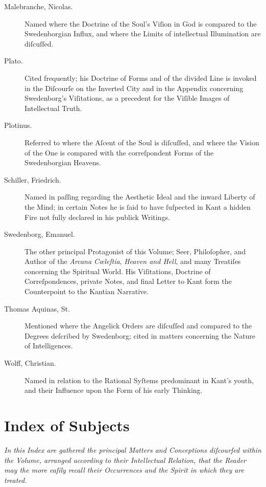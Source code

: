 \documentclass[12pt]{article}
\begin{document}
\begin{description}
\item[Malebranche, Nicolas.]  
Named where the Doctrine of the Soul’s Viſion in God is compared to the 
Swedenborgian Influx, and where the Limits of intellectual Illumination are 
diſcuſſed.

\item[Plato.]  
Cited frequently; his Doctrine of Forms and of the divided Line is invoked 
in the Diſcourſe on the Inverted City and in the Appendix concerning 
Swedenborg’s Viſitations, as a precedent for the Viſible Images of 
Intellectual Truth.

\item[Plotinus.]  
Referred to where the Aſcent of the Soul is diſcuſſed, and where the Vision 
of the One is compared with the correſpondent Forms of the Swedenborgian 
Heavens.

\item[Schiller, Friedrich.]  
Named in paſſing regarding the Aesthetic Ideal and the inward Liberty of the 
Mind; in certain Notes he is ſaid to have ſuſpected in Kant a hidden Fire not 
fully declared in his publick Writings.

\item[Swedenborg, Emanuel.]  
The other principal Protagonist of this Volume; Seer, Philoſopher, and 
Author of the \textit{Arcana Cœleſtia}, \textit{Heaven and Hell}, and many 
Treatiſes concerning the Spiritual World. His Viſitations, Doctrine of 
Correſpondences, private Notes, and final Letter to Kant form the 
Counterpoint to the Kantian Narrative.

\item[Thomas Aquinas, St.]  
Mentioned where the Angelick Orders are diſcuſſed and compared to the 
Degrees deſcribed by Swedenborg; cited in matters concerning the Nature of 
Intelligences.

\item[Wolff, Christian.]  
Named in relation to the Rational Syſtems predominant in Kant’s youth, and 
their Influence upon the Form of his early Thinking.

\end{description}

\newpage

\section*{Index of Subjects}

\begin{center}
\textit{In this Index are gathered the principal Matters and Conceptions 
diſcourſed within the Volume, arranged according to their Intellectual 
Relation, that the Reader may the more eaſily recall their Occurrences 
and the Spirit in which they are treated.}
\end{center}
\end{document}
